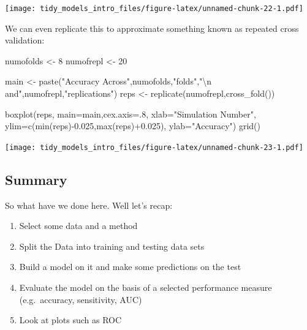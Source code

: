 \documentclass[
]{article}
\newenvironment{Shaded}{\begin{snugshade}}{\end{snugshade}}
\newcommand{\AttributeTok}[1]{\textcolor[rgb]{0.77,0.63,0.00}{#1}}
\newcommand{\DecValTok}[1]{\textcolor[rgb]{0.00,0.00,0.81}{#1}}
\newcommand{\FloatTok}[1]{\textcolor[rgb]{0.00,0.00,0.81}{#1}}
\newcommand{\FunctionTok}[1]{\textcolor[rgb]{0.00,0.00,0.00}{#1}}
\newcommand{\NormalTok}[1]{#1}
\newcommand{\OtherTok}[1]{\textcolor[rgb]{0.56,0.35,0.01}{#1}}
\newcommand{\SpecialCharTok}[1]{\textcolor[rgb]{0.00,0.00,0.00}{#1}}
\newcommand{\StringTok}[1]{\textcolor[rgb]{0.31,0.60,0.02}{#1}}
\providecommand{\tightlist}{%
  \setlength{\itemsep}{0pt}\setlength{\parskip}{0pt}}
\begin{document}
\texttt{[image: tidy\_models\_intro\_files/figure-latex/unnamed-chunk-22-1.pdf]}

We can even replicate this to approximate something known as repeated
cross validation:

\begin{Shaded}
\begin{Highlighting}[]
\NormalTok{numofolds }\OtherTok{\textless{}{-}} \DecValTok{8}
\NormalTok{numofrepl }\OtherTok{\textless{}{-}} \DecValTok{20}

\NormalTok{main }\OtherTok{\textless{}{-}} \FunctionTok{paste}\NormalTok{(}\StringTok{"Accuracy Across"}\NormalTok{,numofolds,}\StringTok{"folds"}\NormalTok{,}\StringTok{"}\SpecialCharTok{\textbackslash{}n}\StringTok{ and"}\NormalTok{,numofrepl,}\StringTok{"replications"}\NormalTok{)}
\NormalTok{reps }\OtherTok{\textless{}{-}} \FunctionTok{replicate}\NormalTok{(numofrepl,}\FunctionTok{cross\_fold}\NormalTok{())}

\FunctionTok{boxplot}\NormalTok{(reps,}
        \AttributeTok{main=}\NormalTok{main,}\AttributeTok{cex.axis=}\NormalTok{.}\DecValTok{8}\NormalTok{,}
        \AttributeTok{xlab=}\StringTok{"Simulation Number"}\NormalTok{,}
        \AttributeTok{ylim=}\FunctionTok{c}\NormalTok{(}\FunctionTok{min}\NormalTok{(reps)}\SpecialCharTok{{-}}\FloatTok{0.025}\NormalTok{,}\FunctionTok{max}\NormalTok{(reps)}\SpecialCharTok{+}\FloatTok{0.025}\NormalTok{),}
        \AttributeTok{ylab=}\StringTok{"Accuracy"}\NormalTok{)}
\FunctionTok{grid}\NormalTok{()}
\end{Highlighting}
\end{Shaded}

\texttt{[image: tidy\_models\_intro\_files/figure-latex/unnamed-chunk-23-1.pdf]}

\hypertarget{summary}{%
\subsection{Summary}\label{summary}}

So what have we done here. Well let's recap:

\begin{enumerate}
\def\labelenumi{\arabic{enumi})}
\tightlist
\item
  Select some data and a method
\item
  Split the Data into training and testing data sets
\item
  Build a model on it and make some predictions on the test
\item
  Evaluate the model on the basis of a selected performance measure
  (e.g.~accuracy, sensitivity, AUC)
\item
  Look at plots such as ROC
\end{enumerate}
\end{document}
